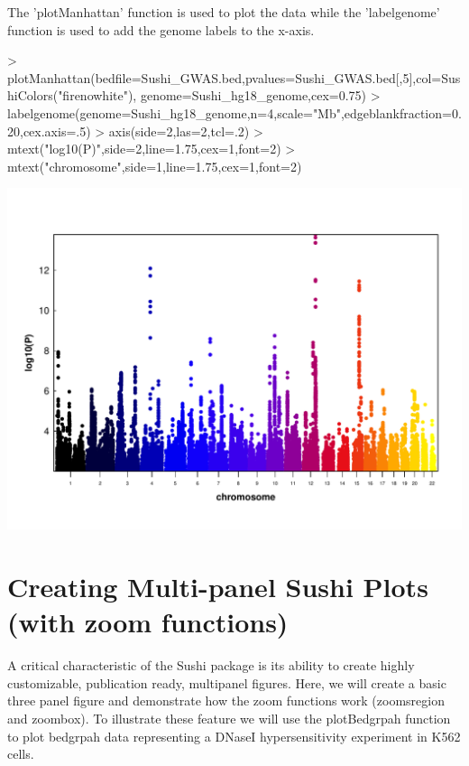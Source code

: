 \documentclass{article}
\begin{document}
The 'plotManhattan' function is used to plot the data while the 'labelgenome' function is used to add the genome labels to the x-axis.

\begin{center}

\begin{Schunk}
\begin{Sinput}
> plotManhattan(bedfile=Sushi_GWAS.bed,pvalues=Sushi_GWAS.bed[,5],col=SushiColors("firenowhite"),
                 genome=Sushi_hg18_genome,cex=0.75)
> labelgenome(genome=Sushi_hg18_genome,n=4,scale="Mb",edgeblankfraction=0.20,cex.axis=.5)
> axis(side=2,las=2,tcl=.2)
> mtext("log10(P)",side=2,line=1.75,cex=1,font=2)
> mtext("chromosome",side=1,line=1.75,cex=1,font=2)
\end{Sinput}
\end{Schunk}
\includegraphics{Sushi-031}
\end{center}














\section{Creating Multi-panel Sushi Plots (with zoom functions) }

A critical characteristic of the Sushi package is its ability to create highly customizable, publication ready, multipanel figures.  Here, we will create a basic three panel figure and demonstrate how the zoom functions work (zoomsregion and zoombox).  To illustrate these feature we will use the plotBedgrpah function to plot bedgrpah data representing a DNaseI hypersensitivity experiment in K562 cells.
\end{document}
